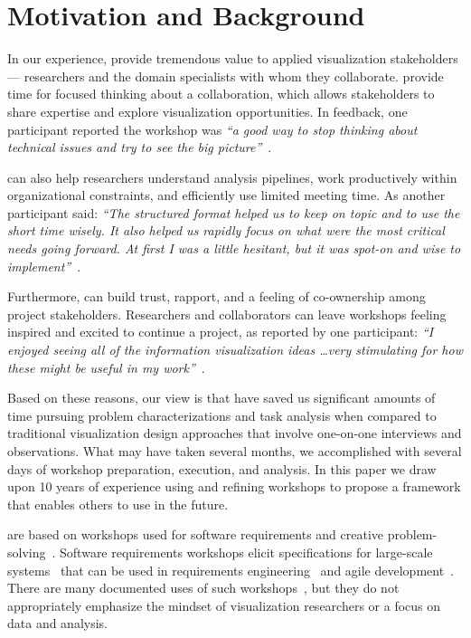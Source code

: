 \section{Motivation and Background}
\label{sec:background}

In our experience, \workshops provide tremendous value to applied visualization stakeholders --- researchers and the domain specialists with whom they collaborate. \workshops provide time for focused thinking about a collaboration, which allows stakeholders to share expertise and explore visualization opportunities. In feedback, one participant reported the workshop was {\it  ``a good way to stop thinking about technical issues and try to see the big picture''}~\cite{Goodwin2016}.

\workshops can also help researchers understand analysis pipelines, work productively within organizational constraints, and efficiently use limited meeting time. As another participant said: {\it ``The structured format helped us to keep on topic and to use the short time wisely. It also helped us rapidly focus on what were the most critical needs going forward. At first I was a little hesitant, but it was spot-on and wise to implement''}~\cite{Lisle2017}.

Furthermore, \workshops can build trust, rapport, and a feeling of co-ownership among project stakeholders. Researchers and collaborators can leave workshops feeling inspired and excited to continue a project, as reported by one participant: {\it ``I enjoyed seeing all of the information visualization ideas \ldots very stimulating for how these might be useful in my work''}~\cite{Goodwin2016}.

Based on these reasons, our view is that \workshops have saved us significant amounts of time pursuing problem characterizations and task analysis when compared to traditional visualization design approaches that involve one-on-one interviews and observations. What may have taken several months, we accomplished with several days of workshop preparation, execution, and analysis. In this paper we draw upon 10 years of experience using and refining workshops to propose a framework that enables others to use \workshops in the future.

\workshops are based on workshops used for software requirements and creative problem-solving~\cite{Goodwin2013}. Software requirements workshops elicit specifications for large-scale systems~\cite{Jones2007} that can be used in requirements engineering~\cite{Jones2005} and agile development~\cite{Hollis2013}. There are many documented uses of such workshops~\cite{Jones2008,Maiden2004,Maiden2007,Maiden2005}, but they do not appropriately emphasize the mindset of visualization researchers or a focus on data and analysis.

